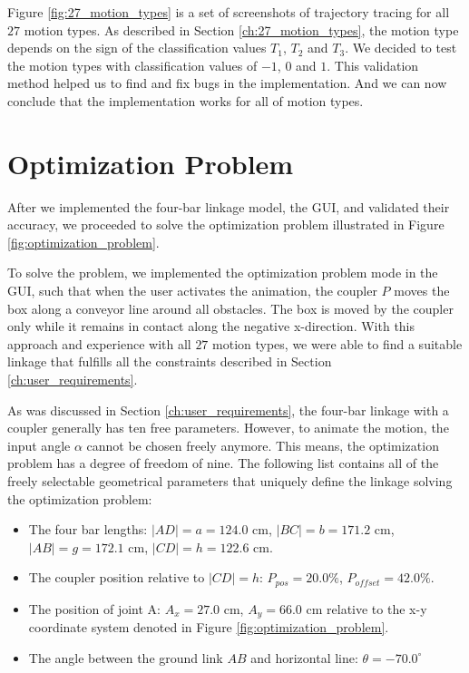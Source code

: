 \documentclass{article}
\begin{document}
Figure \ref{fig:27_motion_types} is a set of screenshots of trajectory tracing for all $27$ motion types. As described in Section \ref{ch:27_motion_types}, the motion type depends on the sign of the classification values $T_1$, $T_2$ and $T_3$. We decided to test the motion types with classification values of $-1$, $0$ and $1$. This validation method helped us to find and fix bugs in the implementation. And we can now conclude that the implementation works for all of motion types.

\section{Optimization Problem}\label{ch:optimization-problem}

After we implemented the four-bar linkage model, the GUI, and validated their accuracy, we proceeded to solve the optimization problem illustrated in Figure \ref{fig:optimization_problem}.

To solve the problem, we implemented the optimization problem mode in the GUI, such that when the user activates the animation, the coupler $P$ moves the box along a conveyor line around all obstacles. The box is moved by the coupler only while it remains in contact along the negative x-direction. With this approach and experience with all $27$ motion types, we were able to find a suitable linkage that fulfills all the constraints described in Section \ref{ch:user_requirements}.

As was discussed in Section \ref{ch:user_requirements}, the four-bar linkage with a coupler generally has ten free parameters. However, to animate the motion, the input angle $\alpha$ cannot be chosen freely anymore. This means, the optimization problem has a degree of freedom of nine. The following list contains all of the freely selectable geometrical parameters that uniquely define the linkage solving the optimization problem:
\begin{itemize}
	\item The four bar lengths: $|AD| = a = 124.0$ cm, $|BC| = b = 171.2$ cm, $|AB| = g = 172.1$ cm, $|CD| = h = 122.6$ cm.
	\item The coupler position relative to $|CD| = h$: $P_{pos} = 20.0 \%$, $P_{offset} = 42.0 \%$.
	\item The position of joint A: $A_x = 27.0$ cm, $A_y = 66.0$ cm relative to the x-y coordinate system denoted in Figure \ref{fig:optimization_problem}.
	\item The angle between the ground link $AB$ and horizontal line: $\theta = -70.0^{\circ}$
\end{itemize}
\end{document}
